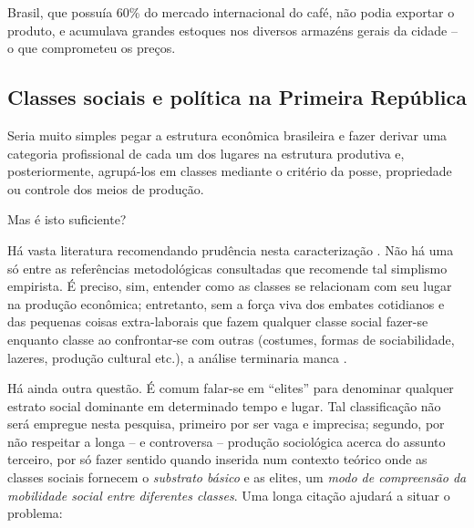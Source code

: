 Brasil, que possuía 60\% do mercado internacional do café, não podia exportar o produto, e acumulava grandes estoques nos diversos armazéns gerais da cidade -- o que comprometeu os preços.

\subsection{Classes sociais e política na Primeira República}\label{subsec:clapolprire}

Seria muito simples pegar a estrutura econômica brasileira e fazer derivar uma categoria profissional de cada um dos lugares na estrutura produtiva e, posteriormente, agrupá-los em classes mediante o critério da posse, propriedade ou controle dos meios de produção. 

Mas é isto suficiente?

Há vasta literatura recomendando prudência nesta caracterização \cite{aguiar_hierarquias_1974, ossowski_classes_1964, schumpeter_imperialismo_1961, velho_classes_1977}. Não há uma só entre as referências metodológicas consultadas que recomende tal simplismo empirista. É preciso, sim, entender como as classes se relacionam com seu lugar na produção econômica; entretanto, sem a força viva dos embates cotidianos e das pequenas coisas extra-laborais que fazem qualquer classe social fazer-se enquanto classe ao confrontar-se com outras (costumes, formas de sociabilidade, lazeres, produção cultural etc.), a análise terminaria manca \cite{aguiar_classe_2009, BERNARDO1991, bernardo_fascismo_2015}.

Há ainda outra questão. É comum falar-se em ``elites'' para denominar qualquer estrato social dominante em determinado tempo e lugar. Tal classificação não será empregue nesta pesquisa, primeiro por ser vaga e imprecisa; segundo, por não respeitar a longa -- e controversa -- produção sociológica acerca do assunto \cite{bottomore_elites_1965,michels_partidos_1982,mosca_elementi_1923,pareto_mind_1935,
schumpeter_capitalismo_1961} terceiro, por só fazer sentido quando inserida num contexto teórico onde as classes sociais fornecem o \textit{substrato básico} e as elites, um \textit{modo de compreensão da mobilidade social entre diferentes classes}. Uma longa citação ajudará a situar o problema:

